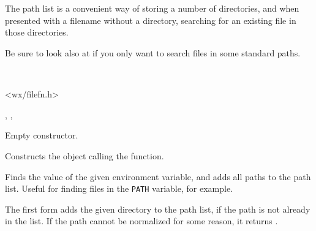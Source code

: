 \section{}\label{wxpathlist}

The path list is a convenient way of storing a number of directories, and
when presented with a filename without a directory, searching for an existing file
in those directories.

Be sure to look also at  if you only
want to search files in some standard paths.


\\


<wx/filefn.h>




, , 



\label{wxpathlistctor}


Empty constructor.


Constructs the object calling the  function.


\label{wxpathlistaddenvlist}


Finds the value of the given environment variable, and adds all paths
to the path list. Useful for finding files in the {\tt PATH} variable, for
example.


\label{wxpathlistadd}



The first form adds the given directory to the path list, if the path is not already in the list.
If the path cannot be normalized for some reason, it returns \false.

